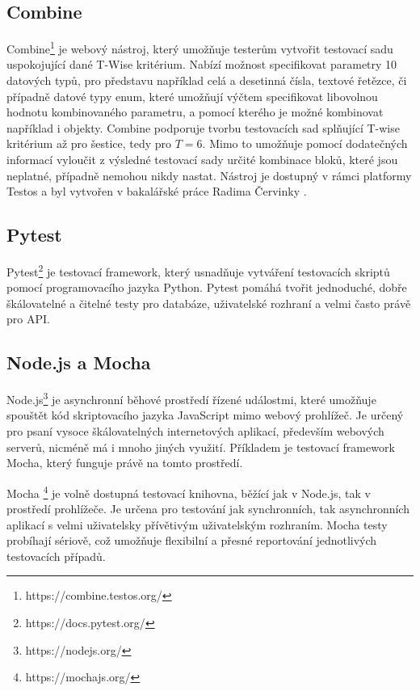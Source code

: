 \subsection*{Combine}
\label{subsec_Combine}
Combine\footnote{https://combine.testos.org/} je webový nástroj, který umožňuje testerům vytvořit testovací sadu uspokojující dané T-Wise kritérium. Nabízí možnost specifikovat parametry 10 datových typů, pro představu například celá a desetinná čísla, textové řetězce, či případně datové typy enum, které umožňují výčtem specifikovat libovolnou hodnotu kombinovaného parametru, a pomocí kterého je možné kombinovat například i objekty. Combine podporuje tvorbu testovacích sad splňující T-wise kritérium až pro šestice, tedy pro $T=6$. Mimo to umožňuje pomocí dodatečných informací vyloučit z výsledné testovací sady určité kombinace bloků, které jsou neplatné, případně nemohou nikdy nastat. Nástroj je dostupný v rámci platformy Testos a byl vytvořen v bakalářské práce Radima Červinky \cite{1_Combine}.



\subsection*{Pytest}
Pytest\footnote{https://docs.pytest.org/} je testovací framework, který usnadňuje vytváření testovacích skriptů pomocí programovacího jazyka Python. Pytest pomáhá tvořit jednoduché, dobře škálovatelné a čitelné testy pro databáze, uživatelské rozhraní a velmi často právě pro API. 


\subsection*{Node.js a Mocha}
Node.js\footnote{https://nodejs.org/} je asynchronní běhové prostředí řízené událostmi, které umožňuje spouštět kód skriptovacího jazyka JavaScript mimo webový prohlížeč. Je určený pro psaní vysoce škálovatelných internetových aplikací, především webových serverů, nicméně má i mnoho jiných využití. Příkladem je testovací framework Mocha, který funguje právě na tomto prostředí.

Mocha \footnote{https://mochajs.org/} je volně dostupná testovací knihovna, běžící jak v Node.js, tak v prostředí prohlížeče. Je určena pro testování jak synchronních, tak asynchronních aplikací s velmi uživatelsky přívětivým uživatelským rozhraním. Mocha testy probíhají sériově, což umožňuje flexibilní a přesné reportování jednotlivých testovacích případů. 

